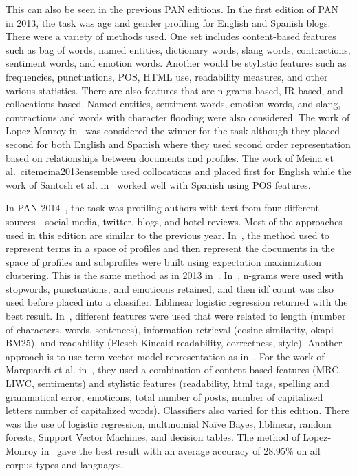 \documentclass[conference]{IEEEtran}
\begin{document}
This can also be seen in the previous PAN editions. In the first edition of PAN~\cite{rangel2013overview} in 2013, the task  was age and gender profiling for English and Spanish blogs. There were a variety of methods used. One set includes content-based features such as bag of words, named entities, dictionary words, slang words, contractions, sentiment words, and emotion words. Another would be stylistic features such as frequencies, punctuations, POS, HTML use, readability measures, and other various statistics. There are also features that are n-grams based, IR-based, and collocations-based. Named entities, sentiment words, emotion words, and slang, contractions and words with character flooding were also considered. The work of Lopez-Monroy in~\cite{lopez2013inaoe} was considered the winner for the task although they placed second for both English and Spanish where they used second order representation based on relationships between documents and profiles. The work of Meina et al.~cite{meina2013ensemble} used collocations and placed first for English while the work of Santosh et al. in~\cite{santosh2013author} worked well with Spanish using POS features.

In PAN 2014~\cite{rangel2014overview}, the task was profiling authors with text from four different sources - social media, twitter, blogs, and hotel reviews. Most of the approaches used in this edition are similar to the previous year. In~\cite{lopezusing}, the method used to represent terms in a space of profiles and then represent the documents in the space of profiles and subprofiles were built using expectation maximization clustering. This is the same method as in 2013 in~\cite{lopez2013inaoe}. In~\cite{maharjansimple}, n-grams were used with stopwords, punctuations, and emoticons retained, and then idf count was also used before placed into a classifier. Liblinear logistic regression returned with the best result. In~\cite{weren6exploring}, different features were used that were related to length (number of characters, words, sentences), information retrieval (cosine similarity, okapi BM25), and readability (Flesch-Kincaid readability, correctness, style). Another approach is to use term vector model representation as in~\cite{villenadaedalus}. For the work of Marquardt et al. in~\cite{marquardt2014age}, they used a combination of content-based features (MRC, LIWC, sentiments) and stylistic features (readability, html tags, spelling and grammatical error, emoticons, total number of posts, number of capitalized letters number of capitalized words). Classifiers also varied for this edition. There was the use of logistic regression, multinomial Naïve Bayes, liblinear, random forests, Support Vector Machines, and decision tables. The method of Lopez-Monroy in~\cite{lopezusing} gave the best result with an average accuracy of 28.95\% on all corpus-types and languages.
\end{document}
